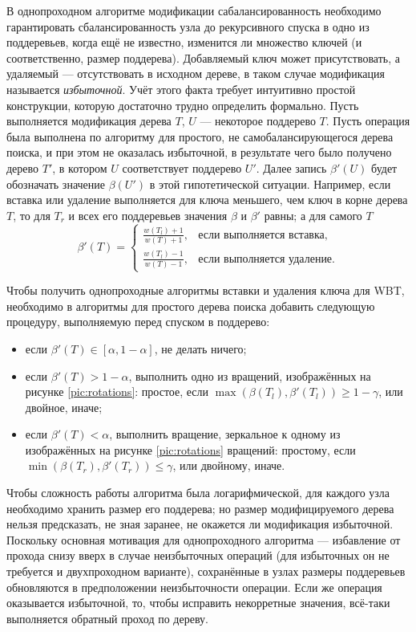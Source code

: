 \documentclass[a4paper,14pt]{extarticle}
\begin{document}
В однопроходном алгоритме модификации
сабалансированность необходимо гарантировать
сбалансированность узла до рекурсивного спуска
в одно из поддеревьев,
когда ещё не известно,
изменится ли множество ключей
(и соответственно, размер поддерева).
Добавляемый ключ может присутствовать,
а удаляемый --- отсутствовать в исходном дереве,
в таком случае модификация называется \emph{избыточной}.
Учёт этого факта требует интуитивно простой конструкции,
которую достаточно трудно определить формально.
Пусть выполняется модификация дерева \( T \),
\( U \) --- некоторое поддерево \( T \).
Пусть операция была выполнена
по алгоритму для простого, не самобалансирующегося
дерева поиска, и при этом не оказалась избыточной,
в результате чего было получено
дерево \( T' \), в котором \( U \) соответствует поддерево \( U' \).
Далее запись \( \beta'(U) \) будет обозначать
значение \( \beta(U') \) в этой гипотетической ситуации.
Например, если вставка или удаление выполняется
для ключа меньшего, чем ключ в корне дерева \( T \),
то для \( T_r \) и всех его поддеревьев
значения \( \beta \) и \( \beta' \) равны;
а для самого \( T \)
\begin{equation}
  \beta'(T) = \begin{cases}
    \frac{w(T_l) + 1}{w(T) + 1}, & \text{если выполняется вставка,} \\
    \frac{w(T_l) - 1}{w(T) - 1}, & \text{если выполняется удаление.}
  \end{cases}
\end{equation}

Чтобы получить однопроходные алгоритмы
вставки и удаления ключа для WBT,
необходимо в алгоритмы для простого дерева поиска
добавить следующую процедуру,
выполняемую перед спуском в поддерево:
\begin{itemize}
  \item если \( \beta'(T) \in [\alpha, 1 - \alpha] \),
    не делать ничего;
  \item если \( \beta'(T) > 1 - \alpha \),
    выполнить одно из вращений,
    изображённых на рисунке \ref{pic:rotations}:
    простое, если \( \max(\beta(T_l), \beta'(T_l)) \geqslant 1 - \gamma \),
    или двойное, иначе;
  \item если \( \beta'(T) < \alpha \),
    выполнить вращение, зеркальное
    к одному из изображённых на
    рисунке \ref{pic:rotations} вращений:
    простому, если \( \min(\beta(T_r), \beta'(T_r)) \leqslant \gamma \),
    или двойному, иначе.
\end{itemize}

Чтобы сложность работы алгоритма была логарифмической,
для каждого узла необходимо хранить размер его поддерева;
но размер модифицируемого дерева нельзя предсказать,
не зная заранее, не окажется ли модификация избыточной.
Поскольку основная мотивация для однопроходного алгоритма ---
избавление от прохода снизу вверх в случае
неизбыточных операций (для избыточных он не требуется и двухпроходном варианте),
сохранённые в узлах размеры поддеревьев обновляются
в предположении неизбыточности операции.
Если же операция оказывается избыточной,
то, чтобы исправить некорретные значения,
всё-таки выполняется обратный проход по дереву.
\end{document}
